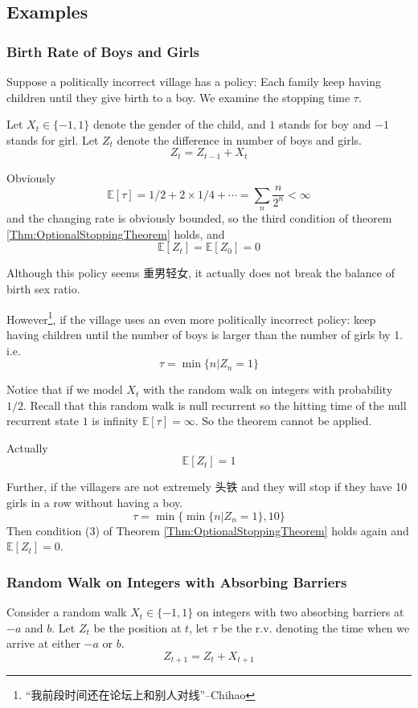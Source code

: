     \subsection{Examples}
        \subsubsection{Birth Rate of Boys and Girls}
            Suppose a politically incorrect village has a policy: Each family keep having children until they give birth to a boy. We examine the stopping time $\tau$.

            Let $X_t \in \{-1, 1\}$ denote the gender of the child, and $1$ stands for boy and $-1$ stands for girl. Let $Z_t$ denote the difference in number of boys and girls.
            \[ Z_t = Z_{t-1} + X_t \]

            Obviously
            \[ \mathbb{E}[\tau] = 1/2 + 2 \times 1/4 + \cdots = \sum_n \frac{n}{2^n} < \infty \]
            and the changing rate is obviously bounded, so the third condition of theorem \ref{Thm:OptionalStoppingTheorem} holds, and
            \[ \mathbb{E}[Z_t] = \mathbb{E}[Z_0] = 0 \]

            Although this policy seems 重男轻女, it actually does not break the balance of birth sex ratio.

            However\footnote{“我前段时间还在论坛上和别人对线”--Chihao}, if the village uses an even more politically incorrect policy: keep having children until the number of boys is larger than the number of girls by 1. i.e.
            \[ \tau = \min\{n|Z_n=1\} \]
            
            Notice that if we model $X_t$ with the random walk on integers with probability $1/2$. Recall that this random walk is null recurrent so the hitting time of the null recurrent state $1$ is infinity $\mathbb{E}[\tau] = \infty$. So the theorem cannot be applied.
            
            Actually
            \[ \mathbb{E}[Z_t] = 1 \]

            Further, if the villagers are not extremely 头铁 and they will stop if they have 10 girls in a row without having a boy.
            \[ \tau = \min\{\min\{n|Z_n=1\}, 10\} \]
            Then condition (3) of Theorem \ref{Thm:OptionalStoppingTheorem} holds again and $\mathbb{E}[Z_t] = 0$.

        \subsubsection{Random Walk on Integers with Absorbing Barriers}
            Consider a random walk $X_t \in \{-1, 1\}$ on integers with two absorbing barriers at $-a$ and $b$. Let $Z_t$ be the position at $t$, let $\tau$ be the r.v. denoting the time when we arrive at either $-a$ or $b$.
            \[ Z_{t+1} = Z_t + X_{t+1} \]

